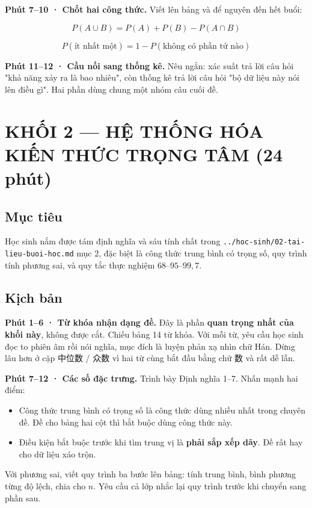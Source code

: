 \documentclass[11pt, a4paper]{article}
\begin{document}
\textbf{Phút 7–10 · Chốt hai công thức.} Viết lên bảng và để nguyên đến hết buổi:

$$P(A \cup B) = P(A) + P(B) - P(A \cap B)$$

$$P(\text{ít nhất một}) = 1 - P(\text{không có phần tử nào})$$

\textbf{Phút 11–12 · Cầu nối sang thống kê.} Nêu ngắn: xác suất trả lời câu hỏi "khả năng xảy ra là bao nhiêu", còn thống kê trả lời câu hỏi "bộ dữ liệu này nói lên điều gì". Hai phần dùng chung một nhóm câu cuối đề.

\section{KHỐI 2 — HỆ THỐNG HÓA KIẾN THỨC TRỌNG TÂM (24 phút)}

\subsection{Mục tiêu}

Học sinh nắm được tám định nghĩa và sáu tính chất trong \texttt{../hoc-sinh/02-tai-lieu-buoi-hoc.md} mục 2, đặc biệt là công thức trung bình có trọng số, quy trình tính phương sai, và quy tắc thực nghiệm $68$–$95$–$99,7$.

\subsection{Kịch bản}

\textbf{Phút 1–6 · Từ khóa nhận dạng đề.} Đây là phần \textbf{quan trọng nhất của khối này}, không được cắt. Chiếu bảng 14 từ khóa. Với mỗi từ, yêu cầu học sinh đọc to phiên âm rồi nói nghĩa, mục đích là luyện phản xạ nhìn chữ Hán. Dừng lâu hơn ở cặp 中位数 / 众数 vì hai từ cùng bắt đầu bằng chữ 数 và rất dễ lẫn.

\textbf{Phút 7–12 · Các số đặc trưng.} Trình bày Định nghĩa 1–7. Nhấn mạnh hai điểm:

\begin{itemize}[leftmargin=1.4em, itemsep=2pt]
\item Công thức trung bình có trọng số là công thức dùng nhiều nhất trong chuyên đề. Đề cho bảng hai cột thì bắt buộc dùng công thức này.
\item Điều kiện bắt buộc trước khi tìm trung vị là \textbf{phải sắp xếp dãy}. Đề rất hay cho dữ liệu xáo trộn.
\end{itemize}

Với phương sai, viết quy trình ba bước lên bảng: tính trung bình, bình phương từng độ lệch, chia cho $n$. Yêu cầu cả lớp nhắc lại quy trình trước khi chuyển sang phần sau.
\end{document}
